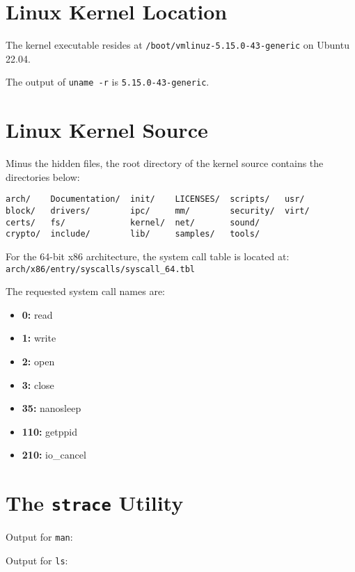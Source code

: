 \documentclass[a4paper, 12pt, titlepage]{article}
\begin{document}
  \section{Linux Kernel Location}

  The kernel executable resides at \texttt{/boot/vmlinuz-5.15.0-43-generic} on Ubuntu 22.04.

  The output of \texttt{uname -r} is \texttt{5.15.0-43-generic}.

  \section{Linux Kernel Source}

  Minus the hidden files, the root directory of the kernel source contains the directories below:

  \begin{verbatim}
arch/    Documentation/  init/    LICENSES/  scripts/   usr/
block/   drivers/        ipc/     mm/        security/  virt/
certs/   fs/             kernel/  net/       sound/
crypto/  include/        lib/     samples/   tools/
  \end{verbatim}

  For the 64-bit x86 architecture, the system call table is located at:\\
  \texttt{arch/x86/entry/syscalls/syscall\_64.tbl}

  The requested system call names are:

  \begin{itemize}
    \item \textbf{0:} read
    \item \textbf{1:} write
    \item \textbf{2:} open
    \item \textbf{3:} close
    \item \textbf{35:} nanosleep
    \item \textbf{110:} getppid
    \item \textbf{210:} io\_cancel
  \end{itemize}

  \section{The \texttt{strace} Utility}

  Output for \texttt{man}:

  

  Output for \texttt{ls}:
\end{document}
